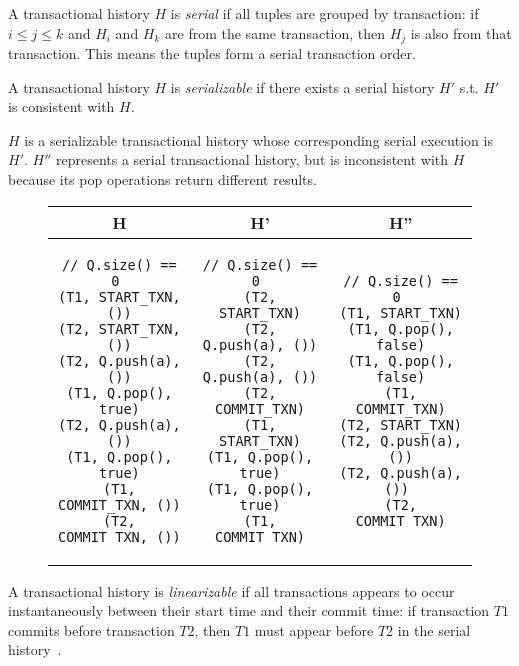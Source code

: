 \begin{defn}
    A transactional history $H$ is \emph{serial} if all tuples are grouped by transaction: if $i\le j\le k$ and $H_i$ and $H_k$ are from the same transaction, then $H_j$ is also from that transaction. This means the tuples form a serial transaction order.
\end{defn}
\begin{defn}
    A transactional history $H$ is \emph{serializable} if there exists a serial history $H'$ s.t. $H'$ is consistent with $H$.

\end{defn}

\begin{eg}
    $H$ is a serializable transactional history whose corresponding serial execution is $H'$. $H''$ represents a serial transactional history, but is inconsistent with $H$ because its pop operations return different results.
\begin{figure}[H]
\singlespacing   
   \begin{tabular}{c|c|c}
H & H' & H''\\
\hline
\begin{lstlisting}
// Q.size() == 0 
(T1, START_TXN, ())
(T2, START_TXN, ())
(T2, Q.push(a), ())
(T1, Q.pop(), true)
(T2, Q.push(a), ())
(T1, Q.pop(), true)
(T1, COMMIT_TXN, ())
(T2, COMMIT_TXN, ())
\end{lstlisting} & 
\begin{lstlisting}
// Q.size() == 0 
(T2, START_TXN)
(T2, Q.push(a), ())
(T2, Q.push(a), ())
(T2, COMMIT_TXN)
(T1, START_TXN)
(T1, Q.pop(), true)
(T1, Q.pop(), true)
(T1, COMMIT_TXN)
\end{lstlisting} &
\begin{lstlisting}
// Q.size() == 0 
(T1, START_TXN)
(T1, Q.pop(), false)
(T1, Q.pop(), false)
(T1, COMMIT_TXN)
(T2, START_TXN)
(T2, Q.push(a), ())
(T2, Q.push(a), ()) 
(T2, COMMIT_TXN)
\end{lstlisting}
\end{tabular}
\end{figure}
\end{eg}

\begin{defn}
A transactional history is \emph{linearizable} if all transactions appears to occur instantaneously between their start time and their commit time: if transaction $T1$ commits before transaction $T2$, then $T1$ must appear before $T2$ in the serial history~\cite{harristm}.
\end{defn}

